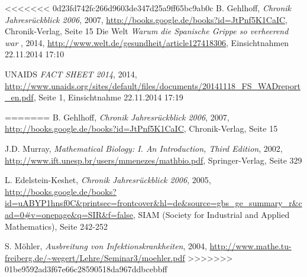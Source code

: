 \documentclass[10pt,twocolumn]{scrartcl}
\begin{document}


%
%

\begin{thebibliography}{99}
<<<<<<< 0d23fd742fc266d9603de347d25a9ff65bc9ab0c
B. Gehlhoff,  \textit{Chronik Jahresrückblick 2006}, 2007,
\url{http://books.google.de/books?id=JtPnf5K1CaIC},
Chronik-Verlag, Seite 15
Die Welt {\it Warum die Spanische Grippe so verheerend war} , 2014, \url{http://www.welt.de/gesundheit/article127418306}, Einsichtnahmen 22.11.2014 17:10
	
UNAIDS {\it FACT SHEET 2014}, 2014,
	\url{http://www.unaids.org/sites/default/files/documents/20141118_FS_WADreport_en.pdf},
	Seite 1, Einsichtnahme 22.11.2014 17:19

=======
	B. Gehlhoff,  \textit{Chronik Jahresrückblick 2006}, 2007,
	\url{http://books.google.de/books?id=JtPnf5K1CaIC},
	Chronik-Verlag, Seite 15

	J.D. Murray,  \textit{Mathematical Biology: I. An Introduction, Third Edition}, 2002,
	\url{http://www.ift.unesp.br/users/mmenezes/mathbio.pdf},
	Springer-Verlag, Seite 329	

	L. Edelstein-Keshet, \textit{Chronik Jahresrückblick 2006}, 2005,
	\url{http://books.google.de/books?id=uABYP1hnsf0C&printsec=frontcover&hl=de&source=gbs_ge_summary_r&cad=0#v=onepage&q=SIR&f=false},
	SIAM (Society for Industrial and Applied Mathematics), Seite 242-252
	
	S. Möhler,  \textit{Ausbreitung von Infektionskrankheiten}, 2004,
	\url{http://www.mathe.tu-freiberg.de/~wegert/Lehre/Seminar3/moehler.pdf}
>>>>>>> 01be9592ad3f67e66c28590518da967ddbcebbff
	
	

\end{thebibliography}
\end{document}
